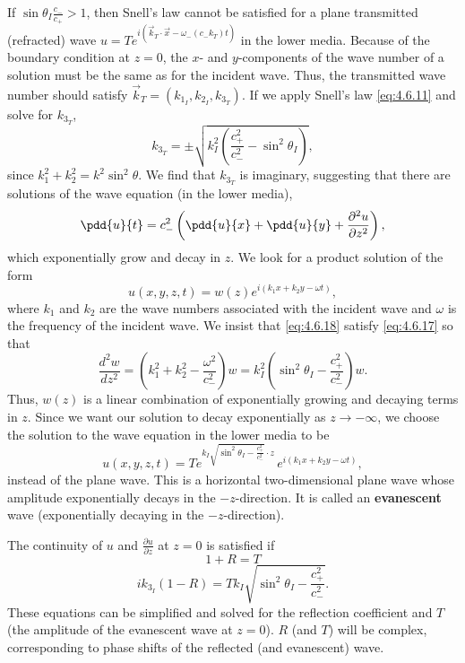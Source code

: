 If $\sin\theta_I\frac{c_-}{c_+} > 1$, then Snell's law cannot be satisfied for a plane transmitted (refracted) wave $u = Te^{i(\vec{k}_T\cdot\vec{x} - \omega_-(c_- k_T)t)}$ in the lower media.  Because of the boundary condition at $z=0$, the $x$- and $y$-components of the wave number of a solution must be the same as for the incident wave.  Thus, the transmitted wave number should satisfy $\vec{k}_T = (k_{1_I}, k_{2_I}, k_{3_T})$.  If we apply Snell's law \eqref{eq:4.6.11} and solve for $k_{3_T}$,
\begin{equation}
k_{3_T} = \pm\sqrt{k_I^2\left(\frac{c_+^2}{c_-^2} - \sin^2\theta_I\right)},
\label{eq:4.6.16}
\end{equation}
since $k_1^2 + k_2^2 = k^2\sin^2\theta$.  We find that $k_{3_T}$ is imaginary, suggesting that there are solutions of the wave equation (in the lower media),
\begin{equation}
\pdd{u}{t} = c_-^2\left(\pdd{u}{x} + \pdd{u}{y} + \frac{\partial^2 u}{\partial z^2}\right),
\label{eq:4.6.17}
\end{equation}
which exponentially grow and decay in $z$.  We look for a product solution of the form
\begin{equation}
u(x,y,z,t) = w(z)e^{i(k_1 x + k_2 y - \omega t)},
\label{eq:4.6.18}
\end{equation}
where $k_1$ and $k_2$ are the wave numbers associated with the incident wave and $\omega$ is the frequency of the incident wave.  We insist that \eqref{eq:4.6.18} satisfy \eqref{eq:4.6.17} so that
\[
\frac{d^2 w}{dz^2} = \left(k_1^2 + k_2^2 - \frac{\omega^2}{c_-^2}\right)w = k_I^2\left(\sin^2\theta_I - \frac{c_+^2}{c_-^2}\right)w.
\]
Thus, $w(z)$ is a linear combination of exponentially growing and decaying terms in $z$.  Since we want our solution to decay exponentially as $z \to -\infty$, we choose the solution to the wave equation in the lower media to be
\[
u(x,y,z,t) = Te^{k_I\sqrt{\sin^2\theta_I - \frac{c_+^2}{c_-^2}}\cdot z}\, e^{i(k_1 x + k_2 y - \omega t)},
\]
instead of the plane wave.  This is a horizontal two-dimensional plane wave whose amplitude exponentially decays in the $-z$-direction.  It is called an \textbf{evanescent} wave (exponentially decaying in the $-z$-direction).

The continuity of $u$ and $\frac{\partial u}{\partial z}$ at $z = 0$ is satisfied if
\begin{equation}
1 + R = T
\label{eq:4.6.19}
\end{equation}
\begin{equation}
ik_{3_I}(1-R) = Tk_I\sqrt{\sin^2\theta_I - \frac{c_+^2}{c_-^2}}.
\label{eq:4.6.20}
\end{equation}
These equations can be simplified and solved for the reflection coefficient and $T$ (the amplitude of the evanescent wave at $z = 0$).  $R$ (and $T$) will be complex, corresponding to phase shifts of the reflected (and evanescent) wave.

